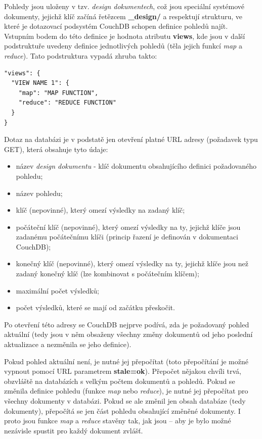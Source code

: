Pohledy jsou uloženy v tzv. {\em design dokumentech}, což jsou speciální systémové dokumenty, jejichž klíč začíná řetězcem {\bf \_design/} a respektují strukturu, ve které je dotazovací podsystém CouchDB schopen definice pohledů najít. Vstupním bodem do této definice je hodnota atributu {\bf views}, kde jsou v další podstruktuře uvedeny definice jednotlivých pohledů (těla jejich funkcí {\em map} a {\em reduce}). Tato podstruktura vypadá zhruba takto:

\begin{verbatim}
"views": {
  "VIEW NAME 1": {
    "map": "MAP FUNCTION",
    "reduce": "REDUCE FUNCTION"
  }
}
\end{verbatim}

Dotaz na databázi je v podstatě jen otevření platné URL adresy (požadavek typu GET), která obsahuje tyto údaje:

\begin{itemize}
\item{název {\em design dokumentu} - klíč dokumentu obsahujícího definici požadovaného pohledu;}
\item{název pohledu;}
\item{klíč (nepovinné), který omezí výsledky na zadaný klíč;}
\item{počáteční klíč (nepovinné), který omezí výsledky na ty, jejichž klíče jsou  zadanému počátečnímu klíči (princip řazení je definován v dokumentaci CouchDB);}
\item{konečný klíč (nepovinné), který omezí výsledky na ty, jejichž klíče jsou  než zadaný konečný klíč (lze kombinovat s počátečním klíčem);}
\item{maximální počet výsledků;}
\item{počet výsledků, které se mají od začátku přeskočit.}
\end{itemize}

Po otevření této adresy se CouchDB nejprve podívá, zda je požadovaný pohled aktuální (tedy jsou v něm obsaženy všechny změny dokumentů od jeho poslední aktualizace a nezměnila se jeho definice). 

Pokud pohled aktuální není, je nutné jej přepočítat (toto přepočítání je možné vypnout pomocí URL parametrem {\bf stale=ok}). Přepočet nějakou chvíli trvá, obzvláště na databázích s velkým počtem dokumentů a pohledů. Pokud se změnila definice pohledu (funkce {\em map} nebo {\em reduce}), je nutné jej přepočítat pro všechny dokumenty v databázi. Pokud se ale změnil jen obsah databáze (tedy dokumenty), přepočítá se jen část pohledu obsahující změněné dokumenty. I proto jsou funkce {\em map} a {\em reduce} stavěny tak, jak jsou -- aby je bylo možné nezávisle spustit pro každý dokument zvlášť.

